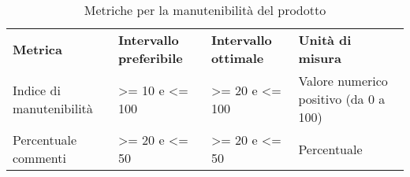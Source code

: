 \renewcommand{\arraystretch}{2.2}
\begin{longtable}{|C{3cm}|C{3cm}|C{3cm}|C{3cm}|}
	
	\caption{Metriche per la manutenibilità del prodotto}\\
	\hline
	
	\textbf{Metrica} & \textbf{Intervallo preferibile}  & \textbf{Intervallo ottimale} & \textbf{Unità di misura}
	\tabularnewline
	\endfirsthead
	
	Indice di manutenibilità &  >= 10 e <= 100 & >= 20 e <= 100 & Valore numerico positivo (da 0 a 100) \\ 
	Percentuale commenti &  >= 20 e <= 50 & >= 20 e <= 50 & Percentuale \\ 
\end{longtable}